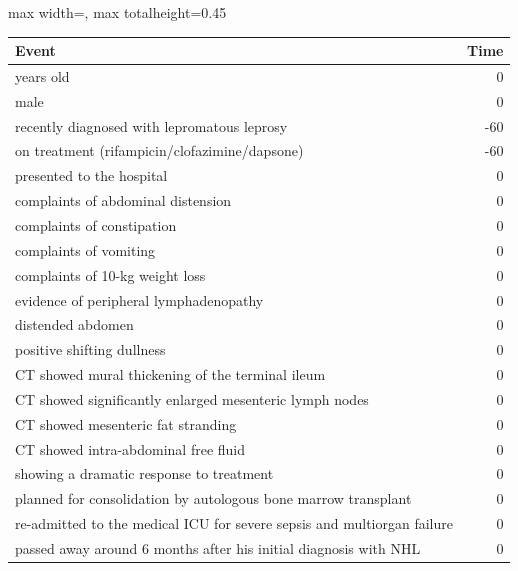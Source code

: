 \begin{ChSixUncaptionedFigure}
\begin{ChSixFloatBody}

\centering
\begin{adjustbox}{max width=\linewidth, max totalheight=0.45\textheight}
\begin{tcolorbox}

\begin{minipage}[t]{0.49\textwidth}\vspace{0pt}
\begin{tcolorbox}[ChSix/annobox,title={Mixtral-8x7B-Instruct v0.1 annotation}]
\ChSixAnnotationTableStyle
\begin{tabular}{>{\raggedright\arraybackslash}p{} r}
\toprule
\textbf{Event} & \textbf{Time} \\
\midrule
57 years old& 0 \\
male & 0 \\
recently diagnosed with lepromatous leprosy & -60 \\
on treatment (rifampicin/clofazimine/dapsone) & -60 \\
presented to the hospital & 0 \\
complaints of abdominal distension & 0 \\
complaints of constipation & 0 \\
complaints of vomiting & 0 \\
complaints of 10-kg weight loss & 0 \\
evidence of peripheral lymphadenopathy & 0 \\
distended abdomen & 0 \\
positive shifting dullness & 0 \\
CT showed mural thickening of the terminal ileum & 0 \\
CT showed significantly enlarged mesenteric lymph nodes & 0 \\
CT showed mesenteric fat stranding & 0 \\
CT showed intra-abdominal free fluid & 0 \\
showing a dramatic response to treatment & 0 \\
planned for consolidation by autologous bone marrow transplant & 0 \\
re-admitted to the medical ICU for severe sepsis and multiorgan failure & 0 \\
passed away around 6 months after his initial diagnosis with NHL & 0 \\

\end{tabular}
\end{tcolorbox}
\end{minipage}
\end{tcolorbox}
\end{adjustbox}
\end{ChSixFloatBody}
\end{ChSixUncaptionedFigure}
